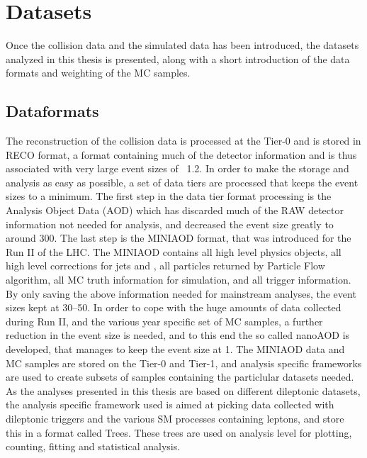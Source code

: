 \section{Datasets}
Once the collision data and the simulated data has been introduced, the datasets analyzed in this thesis is presented, along with a short introduction of the data formats and weighting of the MC samples. 
\subsection{Dataformats}
The reconstruction of the collision data is processed at the Tier-0 and is stored in RECO format, a format containing much of the detector information and is thus associated with very large event sizes of ~1.2\MB. 
In order to make the storage and analysis as easy as possible, a set of data tiers are processed that keeps the event sizes to a minimum.
The first step in the data tier format processing is the Analysis Object Data (AOD) which has discarded much of the RAW detector information not needed for analysis, and decreased the event size greatly to around 300\kB. 
The last step is the MINIAOD format, that was introduced for the Run II of the LHC. 
The MINIAOD contains all high level physics objects, all high level corrections for jets and \ptmiss, all particles returned by Particle Flow algorithm, all MC truth information for simulation, and all trigger information. 
By only saving the above information needed for mainstream analyses, the event sizes kept at 30--50\kB. 
In order to cope with the huge amounts of data collected during Run II, and the various year specific set of MC samples, a further reduction in the event size is needed, and to this end the so called nanoAOD is developed, that manages to keep the event size at 1\kB.  
The MINIAOD data and MC samples are stored on the Tier-0 and Tier-1, and analysis specific frameworks are used to create subsets of samples containing the particlular datasets needed. 
As the analyses presented in this thesis are based on different dileptonic datasets, the analysis specific framework used is aimed at picking data collected with dileptonic triggers and the various SM processes containing leptons, and store this in a format called Trees. 
These trees are used on analysis level for plotting, counting, fitting and statistical analysis.      
